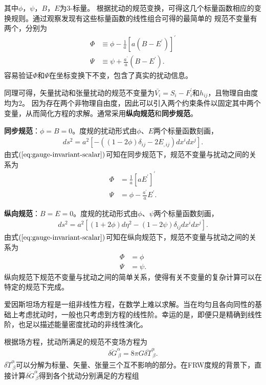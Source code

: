 其中$\phi$，$\psi$，$B$，$E$为3-标量。
根据扰动的规范变换，可得这几个标量函数相应的变换规则。通过观察发现有这些标量函数的线性组合可得的最简单的
规范不变量有两个，分别为
\begin{align}
	\label{eq:gauge-invariant-scalar}
	\Phi & \equiv \phi -\frac{1}{a}{[a{\left(B-E^{\prime}\right)}]}^{\prime} \\
	\Psi & \equiv \psi + \frac{a^{\prime}}{a}{\left(B-E^{\prime}\right)}.
\end{align}
容易验证$\Phi$和$\Psi$在坐标变换下不变，包含了真实的扰动信息。

同理可得，矢量扰动和张量扰动的规范不变量为$\bar{V_{i}}=S_{i}-F^\prime_{i}$和$h_{ij}$，且物理自由度均为$2$。
因为存在两个非物理自由度，因此可以引入两个约束条件以固定其中两个变量，从而简化方程的求解。通常采用\textbf{纵向规范}和\textbf{同步规范}。

\textbf{同步规范}：$\phi=B=0$。度规的扰动形式由$\phi$、$E$两个标量函数刻画，
\begin{align}
	\label{eq:synchronous-gauge-metric}
	ds^2=a^2{\left[-((1-2\phi)\delta_{ij}-2E_{,ij})dx^{i}dx^{j}\right]}.
\end{align}
由式$(\ref{eq:gauge-invariant-scalar})$可知在同步规范下，规范不变量与扰动之间的关系为
\begin{align}
	\Phi & =\frac{1}{a}{\left[aE^\prime\right]}^{\prime} \\
	\Psi & =\phi-\frac{a^\prime}{a}E^\prime.
\end{align}

\textbf{纵向规范}：$B=E=0$。度规的扰动形式由$\phi$、$\psi$两个标量函数刻画，
\begin{align}
	ds^2=a^2{\left[(1+2\phi)d\eta^2-(1-2\psi)\delta_{ij}dx^{i}dx^{j}\right]}.
\end{align}
由式$(\ref{eq:gauge-invariant-scalar})$可知在纵向规范下，规范不变量与扰动之间的关系为
\begin{align}
	\Phi & = \phi  \\
	\Psi & = \psi.
\end{align}
纵向规范下规范不变量与扰动之间的简单关系，使得有关不变量的复杂计算可以在特定的规范下完成。

爱因斯坦场方程是一组非线性方程，在数学上难以求解。当在均匀且各向同性的基础上考虑扰动时，一般也只考虑到方程的线性阶。幸运的是，即便只是精确到线性阶，也足以描述能量密度扰动的非线性演化。

根据场方程，扰动所满足的规范不变场方程为
\begin{align}
	\label{eq:gauge-invariant-perturbation-equation}
	\overline{\delta G}^{\alpha}_{~\beta}=8\pi G\overline{\delta
		T}^{\alpha}_{~\beta}.
\end{align}
$\overline{\delta
		T}^{\alpha}_{~\beta}$可以分解为标量、矢量、张量三个互不影响的部分。在FRW度规的背景下，直接计算$\overline{\delta
		G}^{\alpha}_{~\beta}$得到各个扰动分别满足的方程组

